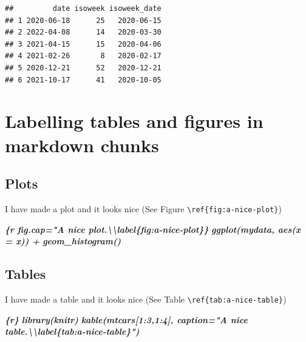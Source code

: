 \documentclass[
]{book}
\newenvironment{Shaded}{\begin{snugshade}}{\end{snugshade}}
\newcommand{\InformationTok}[1]{\textcolor[rgb]{0.56,0.35,0.01}{\textbf{\textit{#1}}}}
\begin{document}
\begin{verbatim}
##         date isoweek isoweek_date
## 1 2020-06-18      25   2020-06-15
## 2 2022-04-08      14   2020-03-30
## 3 2021-04-15      15   2020-04-06
## 4 2021-02-26       8   2020-02-17
## 5 2020-12-21      52   2020-12-21
## 6 2021-10-17      41   2020-10-05
\end{verbatim}

\hypertarget{labelling-tables-and-figures-in-markdown-chunks}{%
\section{Labelling tables and figures in markdown chunks}\label{labelling-tables-and-figures-in-markdown-chunks}}

\hypertarget{plots}{%
\subsection{Plots}\label{plots}}

I have made a plot and it looks nice (See Figure \texttt{\textbackslash{}ref\{fig:a-nice-plot\}})

\begin{Shaded}
\begin{Highlighting}[]
\InformationTok{\textasciigrave{}\textasciigrave{}\textasciigrave{}\{r fig.cap="A nice plot.\textbackslash{}\textbackslash{}label\{fig:a{-}nice{-}plot\}\}}
\InformationTok{ggplot(mydata, aes(x = x)) +}
\InformationTok{  geom\_histogram()}
\InformationTok{\textasciigrave{}\textasciigrave{}\textasciigrave{}}
\end{Highlighting}
\end{Shaded}

\hypertarget{tables}{%
\subsection{Tables}\label{tables}}

I have made a table and it looks nice (See Table \texttt{\textbackslash{}ref\{tab:a-nice-table\}})

\begin{Shaded}
\begin{Highlighting}[]
\InformationTok{\textasciigrave{}\textasciigrave{}\textasciigrave{}\{r\}}
\InformationTok{library(knitr)}
\InformationTok{kable(mtcars[1:3,1:4], caption="A nice table.\textbackslash{}\textbackslash{}label\{tab:a{-}nice{-}table\}")}
\InformationTok{\textasciigrave{}\textasciigrave{}\textasciigrave{}}
\end{Highlighting}
\end{Shaded}
\end{document}
